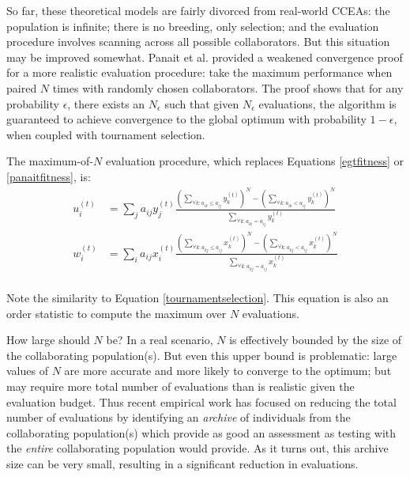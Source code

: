 \documentclass{sig-alt-full}
\begin{document}
So far, these theoretical models are fairly divorced from real-world CCEAs: the population is infinite; there is no breeding, only selection; and the evaluation procedure involves scanning across all possible collaborators.   But this situation may be improved somewhat.  Panait et al. \cite{panait08theoretical} provided a weakened convergence proof for a more realistic evaluation procedure: take the maximum performance when paired \(N\) times with randomly chosen collaborators.  The proof shows that for any probability \(\epsilon\), there exists an \(N_\epsilon\) such that given \(N_\epsilon\) evaluations, the algorithm is guaranteed to achieve convergence to the global optimum with probability \(1-\epsilon\), when coupled with tournament selection.

The maximum-of-\(N\) evaluation procedure, which replaces Equations \ref{egtfitness} or \ref{panaitfitness}, is:
%
\begin{equation}
\label{maxofn}
\begin{split}
u_i^{(t)} &= \sum_j a_{ij} y_j^{(t)} \frac{\left( \sum_{\forall k : a_{ik} \leq a_{ij}} y_k^{(t)} \right)^N \!\!\! -\left( \sum_{\forall k : a_{ik} < a_{ij}} y_k^{(t)} \right)^N} {\sum_{\forall k : a_{ik} = a_{ij}} y_k^{(t)}} \\
w_i^{(t)} &= \sum_i a_{ij} x_i^{(t)} \frac{\left( \sum_{\forall k : a_{kj} \leq a_{ij}} x_k^{(t)} \right)^N \!\!\! - \left( \sum_{\forall k : a_{kj} < a_{ij}} x_k^{(t)} \right)^N} {\sum_{\forall k : a_{kj} = a_{ij}} x_k^{(t)}} \\
\end{split}
\end{equation}

Note the similarity to Equation \ref{tournamentselection}.  This equation is also an order statistic to compute the maximum over $N$ evaluations.   

How large should \(N\) be?  In a real scenario, \(N\) is effectively bounded by the size of the collaborating population(s).  But even this upper bound is problematic: large values of \(N\) are more accurate and more likely to converge to the optimum; but may require more total number of evaluations than is realistic given the evaluation budget.  Thus recent empirical work \cite{Bucci2005gecco,panait06archive} has focused on reducing the total number of evaluations by identifying an {\it archive} of individuals from the collaborating population(s) which provide as good an assessment as testing with the {\it entire} collaborating population would provide.  As it turns out, this archive size can be very small, resulting in a significant reduction in evaluations.
\end{document}
